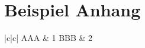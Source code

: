 \section{Beispiel Anhang}
\label{apx:sec:exampleAppendix}

\lipsum[1-5]

\begin{table}
    \begin{tabular}{|c|c|}
        \hline
        AAA & 1
        BBB & 2
        \hline
    \end{tabular}
\caption[Testtabelle]{Testtabelle um zu sehen, dass \texttt{float} Umgebungen auch im Anhang korrekt nummeriert werden.}
\end{table}
